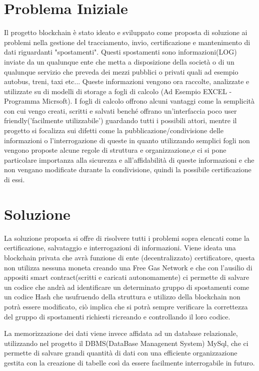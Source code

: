 \documentclass[12pt,titlepage]{report}
\begin{document}
\section{Problema Iniziale}
Il progetto blockchain è stato ideato e sviluppato come proposta di soluzione ai problemi nella gestione del tracciamento, invio, certificazione e mantenimento di dati riguardanti "spostamenti". Questi spostamenti sono informazioni(LOG) inviate da un qualunque ente che metta a disposizione della società o di un qualunque servizio che preveda dei mezzi pubblici o privati quali ad esempio autobus, treni, taxi etc... Queste informazioni vengono ora raccolte, analizzate e utilizzate su di modelli di storage a fogli di calcolo (Ad Esempio EXCEL - Programma Micrsoft). I fogli di calcolo offrono alcuni vantaggi come la semplicità con cui vengo creati, scritti e salvati benché offrano un'interfaccia poco user friendly('facilmente utilizzabile') guardando tutti i possibili attori, mentre il progetto si focalizza sui difetti come la pubblicazione/condivisione delle informazioni o l'interrogazione di queste in quanto utilizzando semplici fogli non vengono proposte alcune regole di struttura e organizzazione,e ci si pone particolare importanza alla sicurezza e all'affidabilità di queste informazioni e che non vengano modificate durante la condivisione, quindi la possibile certificazione di essi.

\section{Soluzione}
La soluzione proposta si offre di risolvere tutti i problemi sopra elencati come la certificazione, salvataggio e interrogazioni di informazioni. Viene ideata una blockchain privata che avrà funzione di ente (decentralizzato) certificatore, questa non utilizza nessuna moneta creando una Free Gas Network e che con l'ausilio di appositi smart contract(scritti e caricati autonomamente) ci permette di salvare un codice che andrà ad identificare un determinato gruppo di spostamenti come un codice Hash che usufruendo della struttura e utilizzo della blockchain non potrà essere modificato, ciò implica che si potrà sempre verificare la correttezza del gruppo di spostamenti richiesti ricreando e controllando il loro codice.

La memorizzazione dei dati viene invece affidata ad un database relazionale, utilizzando nel progetto il DBMS(DataBase Managenent System) MySql, che ci permette di salvare grandi quantità di dati con una efficiente organizzazione gestita con la creazione di tabelle così da essere facilmente interrogabile in futuro.
 
\end{document}
